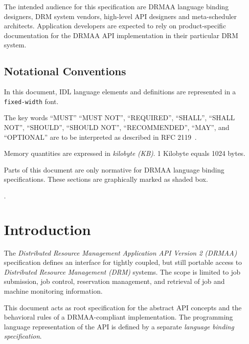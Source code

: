\documentclass{article}
\newcommand{\h}[1]{\lstinline|#1|}
\newcommand{\langbind}[1]{\begin{shaded}#1\end{shaded}}
\newcommand{\rat}[1]{}
\begin{document}
The intended audience for this specification are DRMAA language binding designers, DRM system vendors, high-level API designers and meta-scheduler architects. Application developers are expected to rely on product-specific documentation for the DRMAA API implementation in their particular DRM system.\\


\subsection*{Notational Conventions}
\label{sec:rfc2119}

In this document, IDL language elements and definitions are represented in a \h{fixed-width} font. 

The key words \enquote{MUST} \enquote{MUST NOT}, \enquote{REQUIRED}, \enquote{SHALL}, \enquote{SHALL NOT}, \enquote{SHOULD}, \enquote{SHOULD NOT}, \enquote{RECOMMENDED}, \enquote{MAY},  and \enquote{OPTIONAL} are to be interpreted as described in RFC 2119~\cite{rfc2119}. 

Memory quantities are expressed in \emph{kilobyte (KB)}. 1 Kilobyte equals 1024 bytes. 

\langbind{
Parts of this document are only normative for DRMAA language binding specifications. These sections are graphically marked as shaded box.
}

\rat{The usage of kikibyte as memory quantity unit, as well as the usage of bytes as in JSDL, was rejected by the group (conf call Apr. 13th 2011)}. 

\newpage
\tableofcontents
\newpage

\section{Introduction}
\label{sec:introduction}

 The \emph{Distributed Resource Management Application API Version 2 (DRMAA)} specification defines an interface for tightly coupled, but still portable access to \emph{Distributed Resource Management (DRM)} systems. The scope is limited to job submission, job control, reservation management, and retrieval of job and machine monitoring information. 

This document acts as root specification for the abstract API concepts and the behavioral rules of a DRMAA-compliant implementation. The programming language representation of the API is defined by a separate \emph{language binding specification}.  
\end{document}
